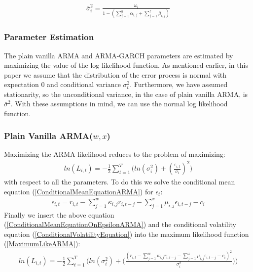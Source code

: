 \begin{align}
    \bar{\sigma}_i^2=\frac{\omega_i}{1-(\sum_{j=1}^y\alpha_{i,j}+\sum_{j=1}^z\beta_{i,j})} \label{longTermVolatilityGARCH}
\end{align}

\subsubsection{Parameter Estimation}

The plain vanilla ARMA and ARMA-GARCH parameters are estimated by maximizing the value of the log likelihood function. As mentioned earlier, in this paper we assume that the distribution of the error process is normal with expectation 0 and conditional variance ${\sigma_t^2}$. Furthermore, we have assumed stationarity, so the unconditional variance, in the case of plain vanilla ARMA, is ${\bar\sigma^2}$. With these assumptions in mind, we can use the normal log likelihood function.

\subsubsection{Plain Vanilla ARMA($w,x$)}

Maximizing the ARMA likelihood reduces to the problem of maximizing:
\begin{align} 
    ln(L_{i,t})=-\frac{1}{2}\sum_{t=1}^T\bigg( ln(\sigma_{i}^2)+(\frac{\epsilon_{i,t}}{\sigma_i})^2\bigg)  \label{MaximumLikeARMA}
\end{align}
with respect to all the parameters. To do this we solve the conditional mean equation (\ref{ConditionalMeanEquationARMA}) for $\epsilon_t$:
\begin{align}
     \epsilon_{i,t}=r_{i,t}-\sum_{j=1}^w\kappa_{i,j} r_{i,t-j}-\sum_{j=1}^x\mu_{i,j} \epsilon_{i,t-j}-c_i \label{ConditionalMeanEquationOnEpsilon}
\end{align}
Finally we insert the above equation (\ref{ConditionalMeanEquationOnEpsilonARMA}) and the conditional volatility equation (\ref{ConditionalVolatilityEquation}) into the maximum likelihood function (\ref{MaximumLikeARMA}):
\begin{align} 
    ln(L_{i,t})=-\frac{1}{2}\sum_{t=1}^T\Bigg( ln(\sigma_i^2)+\Big(\frac{(r_{i,t}-\sum_{j=1}^w\kappa_{i,j} r_{i,t-j}-\sum_{j=1}^x\mu_{i,j} \epsilon_{i,t-j}-c_i)^2}{\sigma_i^2}\Big)\Bigg)  \label{fullMaximumLikeARMA}
\end{align}

